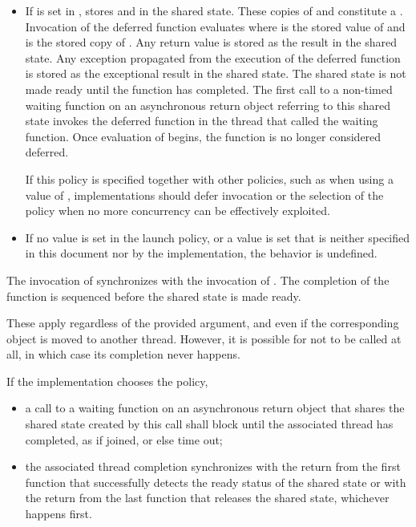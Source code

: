 \begin{itemdescr}
\begin{itemize}
\item
If  is set in ,
stores  and
in the shared state. These copies of  and  constitute
a . Invocation of the deferred function evaluates
 where  is the stored value of
 and  is the stored copy of
.
Any return value is stored
as the result in the shared state.
Any exception propagated
from the execution
of the deferred function
is stored as the exceptional result
in the shared state.
The shared state is not
made ready until the function has completed. The first call to a
non-timed waiting function
on an asynchronous return object referring to
this shared state invokes the
deferred function in the thread that called the waiting function.
Once evaluation of  begins, the function is no longer
considered deferred.

 \recommended
If this policy is specified together with other policies, such as when using a
 value of , implementations should defer
invocation or the selection of the policy when no more concurrency can be effectively
exploited.

\item
If no value is set in the launch policy, or a value is set that is neither specified
in this document nor by the implementation, the behavior is undefined.
\end{itemize}

\pnum
\sync
The invocation of  synchronizes with the invocation of .
The completion of the function  is sequenced before
the shared state is made ready.
\begin{note}
These apply regardless of the provided  argument, and
even if the corresponding  object is moved to another thread.
However, it is possible for  not to be called at all,
in which case its completion never happens.
\end{note}

If the implementation chooses the  policy,
\begin{itemize}
\item
a call to a waiting function on an asynchronous return
object that shares the shared state created by this  call shall
block until the associated thread has completed, as if joined, or else time
out;
\item
the associated thread completion
synchronizes with
the return from
the first function
that successfully detects the ready status of the shared state or
with the return from the last
function that releases the shared state, whichever
happens first.
\end{itemize}


\end{itemdescr}
